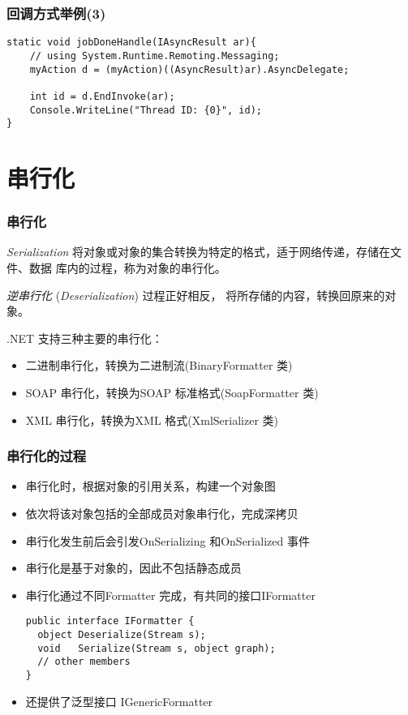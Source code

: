 \begin{frame}[fragile]
\frametitle{回调方式举例(3)}
\begin{lstlisting}
static void jobDoneHandle(IAsyncResult ar){
    // using System.Runtime.Remoting.Messaging;
    myAction d = (myAction)((AsyncResult)ar).AsyncDelegate;

    int id = d.EndInvoke(ar);
    Console.WriteLine("Thread ID: {0}", id);
}
\end{lstlisting}
\end{frame}


\section{串行化}

\begin{frame}
\frametitle{串行化}
\begin{block}{\textit{Serialization}}
\CJKindent 将对象或对象的集合转换为特定的格式，适于网络传递，存储在文件、数据
库内的过程，称为对象的串行化。

{\em 逆串行化} (\textit{Deserialization}) 过程正好相反，
将所存储的内容，转换回原来的对象。
\end{block}
.NET 支持三种主要的串行化：
\begin{itemize}
\item 二进制串行化，转换为二进制流(BinaryFormatter 类)
\item SOAP 串行化，转换为SOAP 标准格式(SoapFormatter 类)
\item XML 串行化，转换为XML 格式(XmlSerializer 类)
\end{itemize}
\end{frame}

\begin{frame}[fragile]
\frametitle{串行化的过程}
\begin{itemize}
\item 串行化时，根据对象的引用关系，构建一个对象图
\item 依次将该对象包括的全部成员对象串行化，完成深拷贝
\item 串行化发生前后会引发OnSerializing 和OnSerialized 事件
\item 串行化是基于对象的，因此不包括静态成员
\medskip \pause
\item 串行化通过不同Formatter 完成，有共同的接口IFormatter
\begin{lstlisting}
public interface IFormatter {
  object Deserialize(Stream s);
  void   Serialize(Stream s, object graph);
  // other members
}
\end{lstlisting}
\item 还提供了泛型接口 IGenericFormatter
\end{itemize}
\end{frame}

